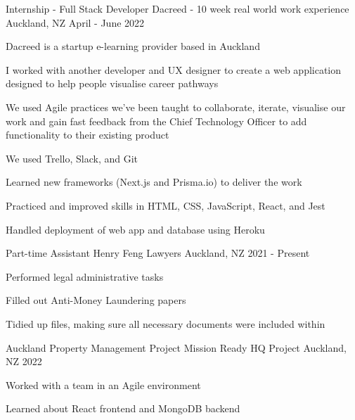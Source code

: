 

\begin{cventries}
\cventry
{Internship - Full Stack Developer} %
{Dacreed - 10 week real world work experience} %
{Auckland, NZ} %
{April - June 2022} %
{
  \begin{cvitems} %
    \item {Dacreed is a startup e-learning provider based in Auckland}
    \item {I worked with another developer and UX designer to create a web application designed to help people visualise career pathways}
    \item {We used Agile practices we've been taught to collaborate, iterate, visualise our work and gain fast feedback from the Chief Technology Officer to add functionality to their existing product}
    \item {We used Trello, Slack, and Git}
    \item {Learned new frameworks (Next.js and Prisma.io) to deliver the work}
    \item {Practiced and improved skills in HTML, CSS, JavaScript, React, and Jest}
    \item {Handled deployment of web app and database using Heroku}
  \end{cvitems}
}

\cventry
{Part-time Assistant} %
{Henry Feng Lawyers} %
{Auckland, NZ} %
{2021 - Present} %
{
  \begin{cvitems} %
    \item {Performed legal administrative tasks}
    \item {Filled out Anti-Money Laundering papers}
    \item {Tidied up files, making sure all necessary documents were included within}
  \end{cvitems}
}

\cventry
{Auckland Property Management Project} %
{Mission Ready HQ Project} %
{Auckland, NZ} %
{2022} %
{
  \begin{cvitems} %
    \item {Worked with a team in an Agile environment}
    \item {Learned about React frontend and MongoDB backend}
  \end{cvitems}
}


\end{cventries}
